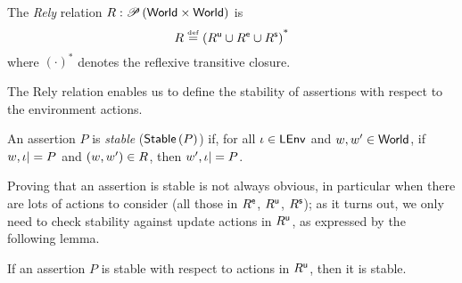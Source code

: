 \begin{definition}[Rely]
  The \emph{Rely} relation $R: \mathscr{P}\left(\textsf{World} \times \textsf{World} \right)$ is
  \[
  R \mathrel{\stackrel{\smash{\scriptscriptstyle{\mathrm{def}}}}{=}}  \left(R^{\textsf{u}} \cup R^{\textsf{e}} \cup R^{\textsf{s}} \right)^{\text{*}}
  \]
  where $(\cdot)^{\text{*}}$ denotes the reflexive transitive closure.
\end{definition}

The Rely relation enables us to define the stability of assertions
with respect to the environment actions.
\begin{definition}[Stability]
  An assertion $P$ is \emph{stable} ($\textsf{Stable}\left(P\right)$) if, for all $\iota
  \in \textsf{LEnv}$ and $w, w' \in \textsf{World}$, if $w, \iota |= P$ and $(w, w')
  \in R$, then $w', \iota |= P$.
\end{definition}

Proving that an assertion is stable is not always obvious, in
particular when there are lots of actions to consider (all those in
$R^{\textsf{e}}$, $R^{\textsf{u}}$, $R^{\textsf{s}}$); as it turns out, we only need to
check stability against update actions in $R^{\textsf{u}}$, as expressed by
the following lemma.

\begin{lemma}[Stability]
  If an assertion $P$ is stable with respect to actions in $R^{\textsf{u}}$,
  then it is stable.
	 
\end{lemma}

